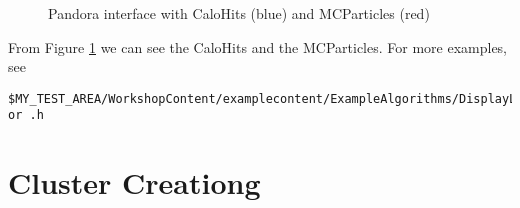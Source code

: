 \begin{figure}[h]
\centering
\caption{Pandora interface with CaloHits (blue) and MCParticles (red)}
\label{fig:calo_and_mc}
\end{figure}

From Figure \ref{fig:calo_and_mc} we can see the CaloHits and the MCParticles. For more examples, see 
\begin{verbatim}
$MY_TEST_AREA/WorkshopContent/examplecontent/ExampleAlgorithms/DisplayListsAlgorithm.cc or .h
\end{verbatim}

\section{Cluster Creationg} \label{sssec:cluster_creation}
